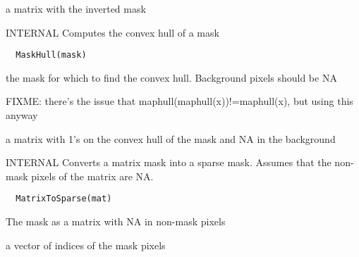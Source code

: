 \documentclass[a4paper]{book}
\begin{document}
%
\begin{Value}
a matrix with the inverted mask
\end{Value}
%
\begin{Description}\relax
INTERNAL Computes the convex hull of a mask
\end{Description}
%
\begin{Usage}
\begin{verbatim}
  MaskHull(mask)
\end{verbatim}
\end{Usage}
%
\begin{Arguments}
\begin{ldescription}
\item[\code{mask}] the mask for which to find the convex hull.
Background pixels should be NA
\end{ldescription}
\end{Arguments}
%
\begin{Details}\relax
FIXME: there's the issue that
maphull(maphull(x))!=maphull(x), but using this anyway
\end{Details}
%
\begin{Value}
a matrix with 1's on the convex hull of the mask and NA
in the background
\end{Value}
%
\begin{Description}\relax
INTERNAL Converts a matrix mask into a sparse mask.
Assumes that the non-mask pixels of the matrix are NA.
\end{Description}
%
\begin{Usage}
\begin{verbatim}
  MatrixToSparse(mat)
\end{verbatim}
\end{Usage}
%
\begin{Arguments}
\begin{ldescription}
\item[\code{mat}] The mask as a matrix with NA in non-mask
pixels
\end{ldescription}
\end{Arguments}
%
\begin{Value}
a vector of indices of the mask pixels
\end{Value}
\end{document}
